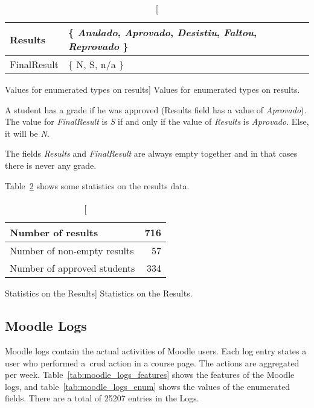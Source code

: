 \begin{table}[h!]
    \centering

    \begin{tabular}{| l | l |}
        \hline
        Results & \{ \textit{Anulado},
                     \textit{Aprovado},
                     \textit{Desistiu},
                     \textit{Faltou},
                     \textit{Reprovado}
                  \} \\ \hline
        FinalResult & \{ N, S, n/a \}  \\ \hline
    \end{tabular}

    \caption
        [Values for enumerated types on results]
        {Values for enumerated types on results.}

    \label{tab:results_fetures_enum}
\end{table}

A student has a grade if he was approved (Results field has a value of
\textit{Aprovado}). The value for \textit{FinalResult} is \textit{S} if and
only if the value of \textit{Results} is \textit{Aprovado}. Else, it will be
\textit{N}.

The fields \textit{Results} and \textit{FinalResult} are always empty together
and in that cases there is never any grade.

Table~\ref{tab:results_stats} shows some statistics on the results data.

\begin{table}[h!]
    \centering

    \begin{tabular}{| l | r |}
        \hline
        Number of results           & 716 \\ \hline
        Number of non-empty results & 57  \\ \hline
        Number of approved students & 334 \\ \hline
    \end{tabular}

    \caption
        [Statistics on the Results]
        {Statistics on the Results.}

    \label{tab:results_stats}
\end{table}

\subsection{Moodle Logs}
\label{sec:logs}

Moodle logs contain the actual activities of Moodle users. Each log entry
states a user who performed a~\gls{crud} action in a course page. The actions
are aggregated per week. Table~\ref{tab:moodle_logs_features} shows the
features of the Moodle logs, and table~\ref{tab:moodle_logs_enum} shows the
values of the enumerated fields. There are a total of 25207 entries in the
Logs.

